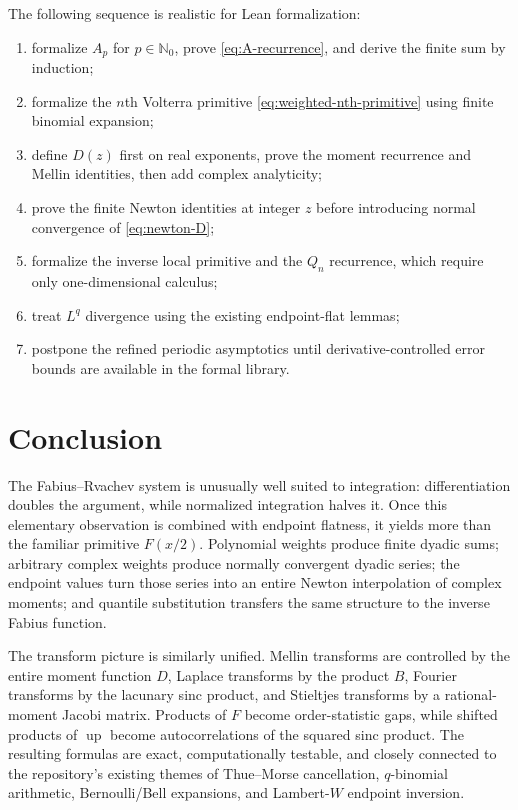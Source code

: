 \documentclass[11pt,oneside]{article}
\theoremstyle{definition}
\theoremstyle{remark}
\newcommand{\N}{\mathbb N}
\newcommand{\upf}{\operatorname{up}}
\begin{document}
The following sequence is realistic for Lean formalization:
\begin{enumerate}
\item formalize $A_p$ for $p\in\N_0$, prove \eqref{eq:A-recurrence}, and derive the finite sum by induction;
\item formalize the $n$th Volterra primitive \eqref{eq:weighted-nth-primitive} using finite binomial expansion;
\item define $D(z)$ first on real exponents, prove the moment recurrence and Mellin identities, then add complex analyticity;
\item prove the finite Newton identities at integer $z$ before introducing normal convergence of \eqref{eq:newton-D};
\item formalize the inverse local primitive and the $Q_n$ recurrence, which require only one-dimensional calculus;
\item treat $L^q$ divergence using the existing endpoint-flat lemmas;
\item postpone the refined periodic asymptotics until derivative-controlled error bounds are available in the formal library.
\end{enumerate}

\section{Conclusion}

The Fabius--Rvachev system is unusually well suited to integration: differentiation doubles the argument, while normalized integration halves it.  Once this elementary observation is combined with endpoint flatness, it yields more than the familiar primitive $F(x/2)$.  Polynomial weights produce finite dyadic sums; arbitrary complex weights produce normally convergent dyadic series; the endpoint values turn those series into an entire Newton interpolation of complex moments; and quantile substitution transfers the same structure to the inverse Fabius function.

The transform picture is similarly unified.  Mellin transforms are controlled by the entire moment function $D$, Laplace transforms by the product $B$, Fourier transforms by the lacunary sinc product, and Stieltjes transforms by a rational-moment Jacobi matrix.  Products of $F$ become order-statistic gaps, while shifted products of $\upf$ become autocorrelations of the squared sinc product.  The resulting formulas are exact, computationally testable, and closely connected to the repository's existing themes of Thue--Morse cancellation, $q$-binomial arithmetic, Bernoulli/Bell expansions, and Lambert-$W$ endpoint inversion.
\end{document}
